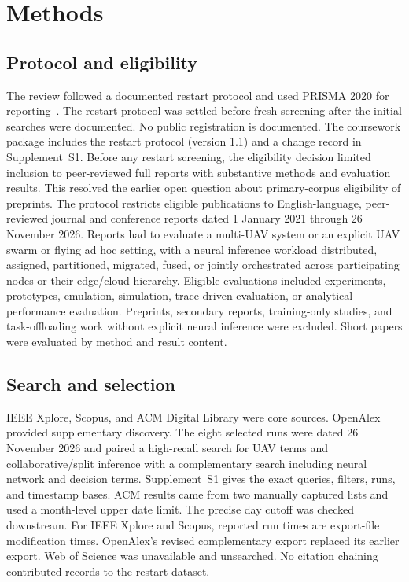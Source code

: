 \documentclass[pdflatex,sn-vancouver-num]{sn-jnl}
\begin{document}
\section{Methods}\label{sec:methods}
\subsection{Protocol and eligibility}\label{sec:eligibility}
The review followed a documented restart protocol and used PRISMA 2020 for reporting~\cite{prisma2020}. The restart protocol was settled before fresh screening after the initial searches were documented. No public registration is documented. The coursework package includes the restart protocol (version 1.1) and a change record in Supplement~S1. Before any restart screening, the eligibility decision limited inclusion to peer-reviewed full reports with substantive methods and evaluation results. This resolved the earlier open question about primary-corpus eligibility of preprints. The protocol restricts eligible publications to English-language, peer-reviewed journal and conference reports dated 1 January 2021 through 26 November 2026. Reports had to evaluate a multi-UAV system or an explicit UAV swarm or flying ad hoc setting, with a neural inference workload distributed, assigned, partitioned, migrated, fused, or jointly orchestrated across participating nodes or their edge/cloud hierarchy. Eligible evaluations included experiments, prototypes, emulation, simulation, trace-driven evaluation, or analytical performance evaluation. Preprints, secondary reports, training-only studies, and task-offloading work without explicit neural inference were excluded. Short papers were evaluated by method and result content.

\subsection{Search and selection}\label{sec:search}
IEEE Xplore, Scopus, and ACM Digital Library were core sources. OpenAlex provided supplementary discovery. The eight selected runs were dated 26 November 2026 and paired a high-recall search for UAV terms and collaborative/split inference with a complementary search including neural network and decision terms. Supplement~S1 gives the exact queries, filters, runs, and timestamp bases. ACM results came from two manually captured lists and used a month-level upper date limit. The precise day cutoff was checked downstream. For IEEE Xplore and Scopus, reported run times are export-file modification times. OpenAlex's revised complementary export replaced its earlier export. Web of Science was unavailable and unsearched. No citation chaining contributed records to the restart dataset.
\end{document}
